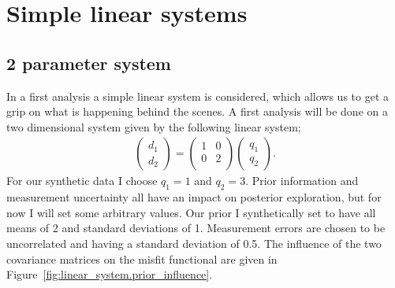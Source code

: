 \section{Simple linear systems}

\subsection{2 parameter system}
In a first analysis a simple linear system is considered, which allows us to get a grip on what is happening behind the scenes. A first analysis will be done on a two dimensional system given by the following linear system;
\begin{gather}\label{eq:linear_system.system}
	\begin{pmatrix}
	d_1\\
	d_2
	\end{pmatrix}
	=
	\begin{pmatrix}
	1 & 0\\
	0 & 2\\
	\end{pmatrix}
	\begin{pmatrix}
	q_1\\q_2
	\end{pmatrix}.
\end{gather}
For our synthetic data I choose $q_1 = 1$ and $q_2 = 3$. Prior information and measurement uncertainty all have an impact on posterior exploration, but for now I will set some arbitrary values. Our prior I synthetically set to have all means of 2 and standard deviations of 1. Measurement errors are chosen to be uncorrelated and having a standard deviation of 0.5. The influence of the two covariance matrices on the misfit functional are given in Figure~\ref{fig:linear_system.prior_influence}.

